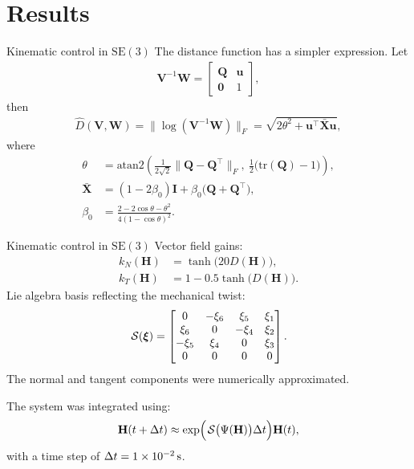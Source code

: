 \section{Results}
\begin{frame}{Kinematic control in $\text{SE}(3)$}
    The distance function has a simpler expression. Let
    \begin{align*}
        \mathbf{V}^{-1}\mathbf{W}
    = \begin{bmatrix}
        \mathbf{Q} & \mathbf{u} \\
        \mathbf{0} & 1
    \end{bmatrix},
    \end{align*}
    then
    \begin{align*}
        \widehat{D}(\mathbf{V},\mathbf{W}) = \|\log(\mathbf{V}^{-1}\mathbf{W})\|_F = \sqrt{2\theta^2 + \mathbf{u}^\top\bar{\mathbf{X}}\mathbf{u}},
    \end{align*}
    where
    \begin{align*}
        \theta &= \text{atan2}\left(\frac{1}{2\sqrt{2}}\|\mathbf{Q}{-}\mathbf{Q}^{\top}\|_F,\  \frac{1}{2}\bigl(\text{tr}(\mathbf{Q})-1\bigr)\right),\\
        \bar{\mathbf{X}} &= (1-2\beta_0)\mathbf{I} + \beta_0\bigl(\mathbf{Q} + \mathbf{Q}^\top\bigr),\\
        \beta_0&=\frac{2-2\cos\theta-\theta^2}{4(1 - \cos\theta)^2}.
    \end{align*}
\end{frame}

\begin{frame}{Kinematic control in $\text{SE}(3)$}
    Vector field gains:
    \begin{align*}
        k_N(\mathbf{H}) &= \tanh\bigl(20D(\mathbf{H})\bigr),\\
        k_T(\mathbf{H}) &= 1 - 0.5\tanh\bigl(D(\mathbf{H})\bigr).
    \end{align*}
    Lie algebra basis reflecting the mechanical twist:
    \begin{align*}
        \SL[\boldsymbol{\xi}] = \begin{bmatrix}
        0 & -\xi_6 & \xi_5 & \xi_1 \\
        \xi_6 & 0 & -\xi_4 & \xi_2 \\
        -\xi_5 & \xi_4 & 0 & \xi_3 \\
        0 & 0 & 0 & 0
        \end{bmatrix}.
    \end{align*}
    The normal and tangent components were numerically approximated. 
    
    The system was integrated using:
    \begin{align*}
        \mathbf{H}(t + \Delta t) \approx \exp\Bigl(\SL\bigl(\Psi(\mathbf{H})\bigr)\Delta t\Bigr)\mathbf{H}(t),
    \end{align*}
    with a time step of $\Delta t = \qty{1E-2}{\second}$. 
\end{frame}

